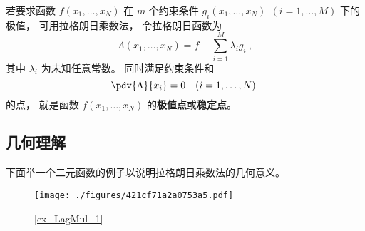 

若要求函数 $f(x_1,\dots, x_N)$ 在 $m$ 个约束条件 $g_i(x_1, \dots, x_N)\ \ (i = 1,\dots, M)$ 下的极值， 可用拉格朗日乘数法， 令拉格朗日函数为
\begin{equation}
\Lambda(x_1,\dots, x_N) = f + \sum_{i=1}^M \lambda_i g_i~,
\end{equation} 
其中 $\lambda_i$ 为未知任意常数。 同时满足约束条件和
\begin{equation}
\pdv{\Lambda}{x_i} = 0 \quad (i = 1,\dots, N)~
\end{equation}
的点， 就是函数 $f(x_1, \dots, x_N)$ 的\textbf{极值点}或\textbf{稳定点}。

\subsection{几何理解}

下面举一个二元函数的例子以说明拉格朗日乘数法的几何意义。

\begin{figure}[ht]
\centering
\texttt{[image: ./figures/421cf71a2a0753a5.pdf]}
\caption{\autoref{ex_LagMul_1} } \label{fig_LagMul_1}
\end{figure}

